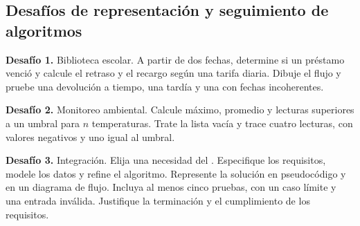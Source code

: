 \subsection{Desafíos de representación y seguimiento de algoritmos}

\textbf{Desafío 1.} Biblioteca escolar. A partir de dos fechas, determine si un préstamo venció y calcule el retraso y el recargo según una tarifa diaria. Dibuje el flujo y pruebe una devolución a tiempo, una tardía y una con fechas incoherentes.

\textbf{Desafío 2.} Monitoreo ambiental. Calcule máximo, promedio y lecturas superiores a un umbral para \(n\) temperaturas. Trate la lista vacía y trace cuatro lecturas, con valores negativos y uno igual al umbral.

\textbf{Desafío 3.} Integración. Elija una necesidad del . Especifique los requisitos, modele los datos y refine el algoritmo. Represente la solución en pseudocódigo y en un diagrama de flujo. Incluya al menos cinco pruebas, con un caso límite y una entrada inválida. Justifique la terminación y el cumplimiento de los requisitos.
